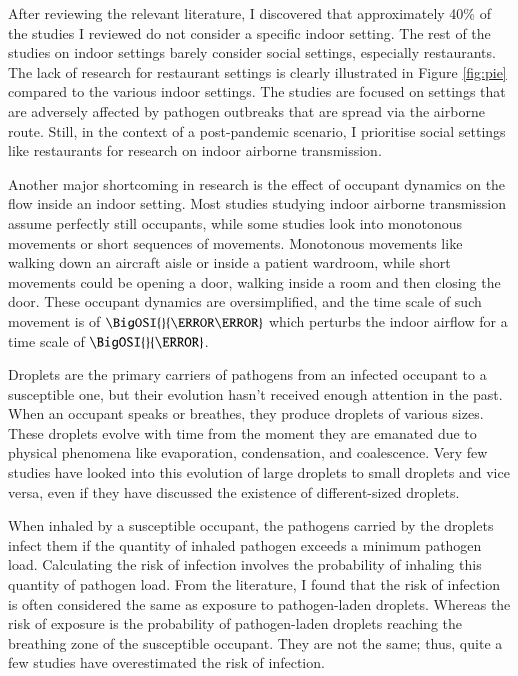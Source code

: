 \documentclass[preprint,12pt]{elsarticle}
\begin{document}
After reviewing the relevant literature, I discovered that approximately 40\% of the studies I reviewed do not consider a specific indoor setting. The rest of the studies on indoor settings barely consider social settings, especially restaurants. The lack of research for restaurant settings is clearly illustrated in Figure \ref{fig:pie} compared to the various indoor settings. The studies are focused on settings that are adversely affected by pathogen outbreaks that are spread via the airborne route. Still, in the context of a post-pandemic scenario, I prioritise social settings like restaurants for research on indoor airborne transmission. 

Another major shortcoming in research is the effect of occupant dynamics on the flow inside an indoor setting. Most studies studying indoor airborne transmission assume perfectly still occupants, while some studies look into monotonous movements or short sequences of movements. Monotonous movements like walking down an aircraft aisle or inside a patient wardroom, while short movements could be opening a door, walking inside a room and then closing the door. These occupant dynamics are oversimplified, and the time scale of such movement is of $\BigOSI{}{\milli\second}$ which perturbs the indoor airflow for a time scale of $\BigOSI{}{\second}$.

Droplets are the primary carriers of pathogens from an infected occupant to a susceptible one, but their evolution hasn't received enough attention in the past. When an occupant speaks or breathes, they produce droplets of various sizes. These droplets evolve with time from the moment they are emanated due to physical phenomena like evaporation, condensation, and coalescence. Very few studies have looked into this evolution of large droplets to small droplets and vice versa, even if they have discussed the existence of different-sized droplets.

When inhaled by a susceptible occupant, the pathogens carried by the droplets infect them if the quantity of inhaled pathogen exceeds a minimum pathogen load. Calculating the risk of infection involves the probability of inhaling this quantity of pathogen load. From the literature, I found that the risk of infection is often considered the same as exposure to pathogen-laden droplets. Whereas the risk of exposure is the probability of pathogen-laden droplets reaching the breathing zone of the susceptible occupant. They are not the same; thus, quite a few studies have overestimated the risk of infection.
\end{document}
